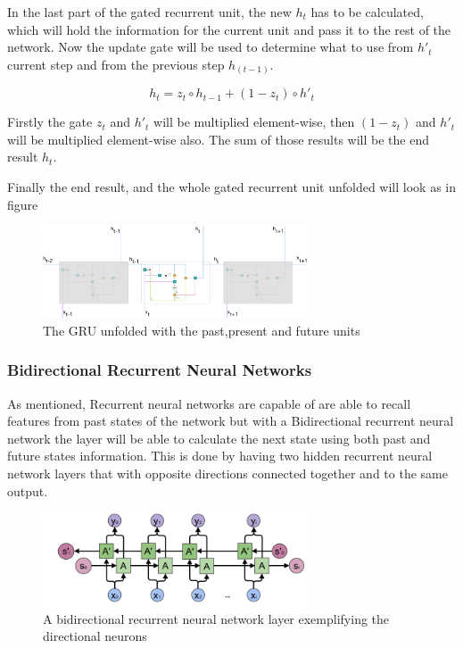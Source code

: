 In the last part of the gated recurrent unit, the new $h_t$ has to be calculated, which will hold the information for the current unit and pass it to the rest of the network.
Now the update gate will be used to determine what to use from $h'_t$ current step and from the previous step $h_{(t-1)}$.

\begin{equation}
h_t=z_t \circ h_{t-1}+(1-z_t) \circ h'_t
\end{equation}

Firstly the gate $z_t$ and $h'_t$ will be multiplied element-wise, then $(1-z_t)$ and $h'_t$ will be multiplied element-wise also. The sum of those results will be the end result $h_t$. 

Finally the end result, and the whole gated recurrent unit unfolded will look as in figure 

\begin{figure}[htp]
	\centering
	\includegraphics[width=0.7\textwidth]{Illustrations/GRUunfolded.png}
	\caption{The GRU unfolded with the past,present and future units}
	\label{fig:GRUunfolded}
\end{figure}

\subsubsection{Bidirectional Recurrent Neural Networks} 
As mentioned, Recurrent neural networks are capable of are able to recall features from past states of the network but with a Bidirectional recurrent neural network the layer will be able to calculate the next state using both past and future states information. This is done by having two hidden recurrent neural network layers that with opposite directions connected together and to the same output. 

\begin{figure}[htp]
	\centering
	\includegraphics[width=0.7\textwidth]{Illustrations/BRNN.png}
	\caption{A bidirectional recurrent neural network layer exemplifying the directional neurons}
	\label{fig:BRNN}
\end{figure}

